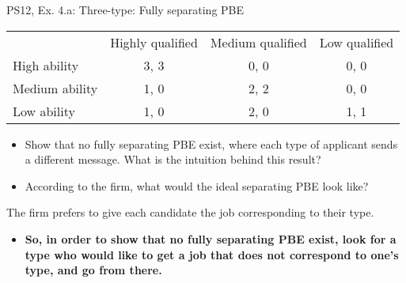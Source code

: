 \begin{frame}{PS12, Ex. 4.a: Three-type: Fully separating PBE}
    \begin{table}
      \begin{tabular}{l|c|c|c|}
          \multicolumn{1}{c}{} & \multicolumn{1}{c}{Highly qualified} & \multicolumn{1}{c}{Medium qualified} & \multicolumn{1}{c}{Low qualified} \\\cline{2-4}
          High ability   & 3, 3 & 0, 0 & 0, 0 \\\cline{2-4}
          Medium ability & 1, 0 & 2, 2 & 0, 0 \\\cline{2-4}
          Low ability    & 1, 0 & 2, 0 & 1, 1 \\\cline{2-4}
      \end{tabular}
    \end{table}\vspace{-8pt}
    \begin{itemize}
      \item[(a)] Show that no fully separating PBE exist, where each type of applicant sends a different message. What is the intuition behind this result?
      \item[Step 1:] According to the firm, what would the ideal separating PBE look like?
    \end{itemize}\vspace{-6pt}
    The firm prefers to give each candidate the job corresponding to their type.\vspace{-4pt}
    \begin{itemize}
      \item[Step 2:] \textbf{So, in order to show that no fully separating PBE exist, look for a type who would like to get a job that does not correspond to one's type, and go from there.}
    \end{itemize}
    \vfill\null
\end{frame}
